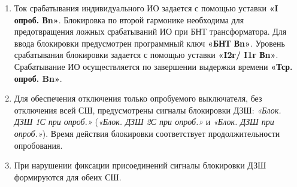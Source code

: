 \begin{enumerate}
\item
Ток срабатывания индивидуального ИО задается с помощью уставки \textbf{«I опроб. Вn»}. Блокировка по второй гармонике необходима для предотвращения ложных срабатываний ИО при БНТ трансформатора.
Для ввода блокировки предусмотрен программный ключ \textbf{«БНТ Вn»}. Уровень срабатывания блокировки задается с помощью уставки \textbf{«I2г/ I1г Вn»}. Срабатывание ИО осуществляется по завершении выдержки времени \textbf{«Тср. опроб. Bn»}.

\item
Для обеспечения отключения только опробуемого выключателя, без отключения всей СШ, предусмотрены сигналы блокировки ДЗШ: \textit{«Блок. ДЗШ 1С при опроб.»} (\textit{«Блок. ДЗШ 2С при опроб.»} и \textit{«Блок. ДЗШ при опроб.»}). Время действия блокировки соответствует продолжительности опробования.

\item
При нарушении фиксации присоединений сигналы блокировки ДЗШ формируются для обеих СШ.

\end{enumerate}
